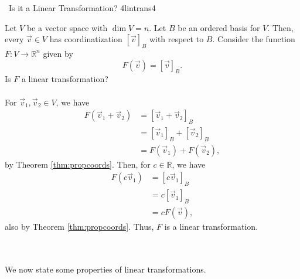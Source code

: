         \begin{example}{\Difficulty\,\Difficulty\,\,Is it a Linear Transformation? 4}{lintrans4}

            Let \(V\) be a vector space with \(\dim V=n\). Let \(B\) be an ordered basis for \(V\). Then, every \(\vec{v}\in V\) has coordinatization \([\vec{v}]_B\) with respect to \(B\). Consider the function \(F:V\to\mathbb{R}^n\) given by 
            \begin{equation*}
                F(\vec{v})=[\vec{v}]_B.
            \end{equation*}
            Is \(F\) a linear transformation?
            \\
            \\
            For \(\vec{v}_1,\vec{v}_2\in V\), we have
            \begin{align*}
                F(\vec{v}_1+\vec{v}_2)&=[\vec{v}_1+\vec{v}_2]_B \\
                &=[\vec{v}_1]_B+[\vec{v}_2]_B \\
                &=F(\vec{v}_1)+F(\vec{v}_2),
            \end{align*}
            by Theorem \ref{thm:propcoords}. Then, for \(c\in\mathbb{R}\), we have
            \begin{align*}
                F(c\vec{v}_1)&=[c\vec{v}_1]_B \\
                &=c[\vec{v}_1]_B \\
                &=cF(\vec{v}),
            \end{align*}
            also by Theorem \ref{thm:propcoords}. Thus, \(F\) is a linear transformation.

        \end{example}
        \pagebreak
        \vphantom
        \\
        \\
        We now state some properties of linear transformations.
